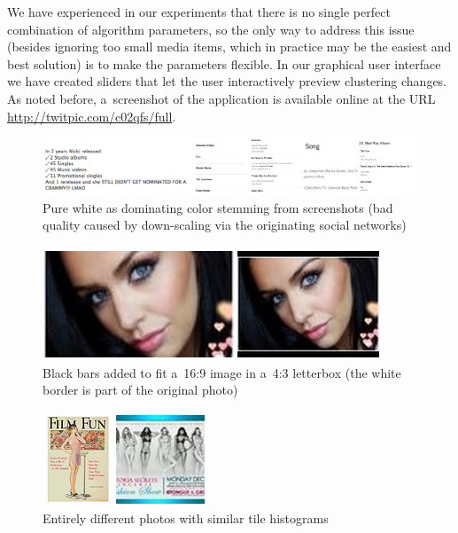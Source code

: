 We have experienced in our experiments that there is no single perfect
combination of algorithm parameters,
so the only way to address this issue (besides ignoring too small media items,
which in practice may be the easiest and best solution)
is to make the parameters flexible.
In our graphical user interface we have created sliders
that let the user interactively preview clustering changes.
As noted before, a~screenshot of the application
is available online at the URL \url{http://twitpic.com/c02qfs/full}.

\begin{figure}[h!]
  \centering
  \includegraphics[width=1\linewidth]{./white.png}
  \caption[Pure white as dominating color stemming from screenshots]
    {Pure white as dominating color stemming from screenshots
    (bad quality caused by down-scaling via the originating social networks)}
  \label{fig:white}
\end{figure}

\begin{figure}[h!]
  \centering
  \includegraphics[width=0.55\linewidth]{./bwtolerance.png}
  \caption[Black bars added to fit a~16:9 image in a~4:3 letterbox]
    {Black bars added to fit a~16:9 image in a~4:3 letterbox
    (the white border is part of the original photo)}
  \label{fig:bwtolerance}
\end{figure}

\begin{figure}[h!]
  \centering
  \includegraphics[width=0.4\linewidth]{./weakness.png}
  \caption{Entirely different photos with similar tile histograms}
  \label{fig:weakness}
\end{figure}

